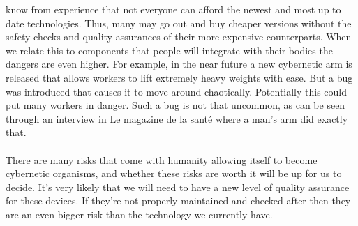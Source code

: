 \documentclass[12pt,a4paper,notitlepage]{article}
\begin{document}
know from experience that not everyone can afford the newest and most up to date
technologies. Thus, many may go out and buy cheaper versions without the safety
checks and quality assurances of their more expensive counterparts. When we
relate this to components that people will integrate with their bodies the
dangers are even higher. For example, in the near future a new cybernetic arm is
released that allows workers to lift extremely heavy weights with ease. But a
bug was introduced that causes it to move around chaotically. Potentially this
could put many workers in danger. Such a bug is not that uncommon, as can be
seen through an interview in Le magazine de la sant\'{e} where a man's arm did
exactly that. 
\\\\
There are many risks that come with humanity allowing itself to become
cybernetic organisms, and whether these risks are worth it will be up for us to
decide. It's very likely that we will need to have a new level of quality
assurance for these devices. If they're not properly maintained and checked
after then they are an even bigger risk than the technology we currently have.
\\
\end{document}
